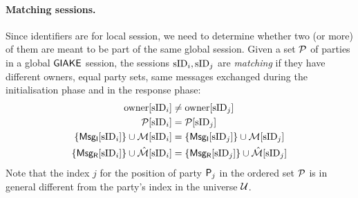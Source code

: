 \paragraph{Matching sessions.} Since identifiers are for local session, we need to determine whether two (or more) of them are meant to be part of the same global session. 
Given a set $\PartySet$ of parties in a global $\GIAKE$ session, the sessions $\sid_{i}, \sid_j$ are \textit{matching} if they have different owners, equal party sets, same messages exchanged during the initialisation phase and in the response phase:
	\begin{align*}
		\owner[\sID_{i}] &\neq \owner[\sID_j] \\
		\GakeUSet[\sID_{i}] &= \GakeUSet[\sID_j]  \\
		\changehighlight{\{\GIniMes[\sID_{i}]\}} \cup \GIniMesSet[\sID_{i}] &= \changehighlight{\{\GIniMes[\sID_j]\}} \cup \GIniMesSet[\sID_j]   \\
		\changehighlight{\{\GResMes[\sID_{i}]\}} \cup \GResMesSet[\sID_{i}] &= \changehighlight{\{\GResMes[\sID_j]\}}\cup \GResMesSet[\sID_j]  
	\end{align*}
Note that the index $j$ for the position of party $\User[j]$ in the ordered set $\PartySet$ is in general different from the party's index in the universe $\Universe$.
%
%

